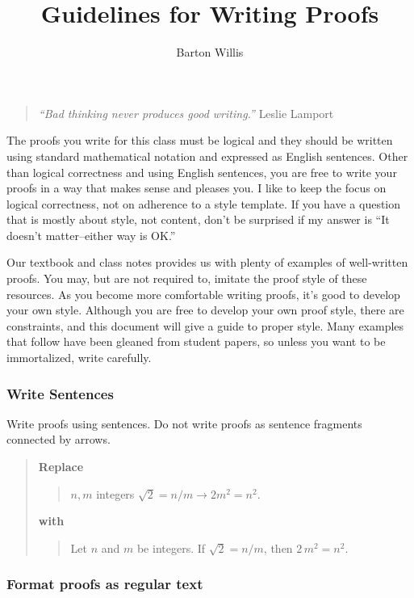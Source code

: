 \documentclass[12pt,fleqn]{article}
\title{ Guidelines for Writing Proofs}
\author{Barton Willis}
\newcounter{ex}\setcounter{ex}{0}
\newcounter{id}\setcounter{id}{0}
\newcounter{se}\setcounter{se}{0}
\begin{document}
\maketitle



\begin{quote}
  \emph{ “Bad thinking never produces good writing.”} \hfill   {\sc Leslie Lamport}
\end{quote}

\normalsize
The proofs you write for this class must be logical and they should be written using standard mathematical notation and expressed as English sentences. Other than logical correctness and using English sentences, you are free to write your proofs
in a way that makes sense and pleases you.  I like to keep the focus on logical correctness, not on adherence to a style template. If you have a question that is mostly about style, not content, don't be surprised if my answer is ``It doesn't 
matter--either way is OK.'' 

Our textbook and class notes provides us with plenty of examples of well-written proofs. You may, but are not required to, imitate the proof style of these resources. As you become more comfortable writing proofs, it's good to develop your own style. Although you are free to develop your own proof style, there are constraints, and this document will give a guide
to proper style.  Many examples that follow have been gleaned from student papers, so  unless you want to be  immortalized, write carefully.


\subsubsection{Write Sentences}

Write proofs using sentences. Do not write proofs as sentence fragments connected by 
arrows.
\begin{quote}
\textbf{Replace}
\begin{quote}
\(n,m\) integers \(\sqrt{2} = n / m  \longrightarrow 2 m^2 = n^2\). 
\end{quote}
\textbf{with}
\begin{quote}
Let \(n\) and \(m\) be integers. If \(\sqrt{2} = n / m\), then \(2 \, m^2 = n^2\).
\end{quote}
\end{quote}


\subsubsection{Format proofs as regular text}
\end{document}
